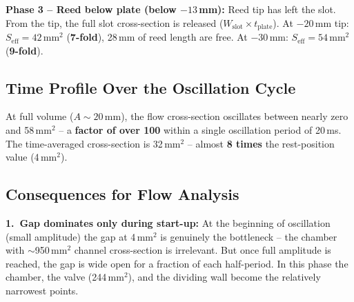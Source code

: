 \documentclass[11pt,a4paper]{article}
\begin{document}
\textbf{Phase 3 -- Reed below plate (below $-13$\,mm):} Reed tip has left the slot. From the tip, the full slot cross-section is released ($W_\text{slot} \times t_\text{plate}$). At $-20$\,mm tip: $S_\text{eff} = 42$\,mm$^2$ (\textbf{7-fold}), 28\,mm of reed length are free. At $-30$\,mm: $S_\text{eff} = 54$\,mm$^2$ (\textbf{9-fold}).

\subsection{Time Profile Over the Oscillation Cycle}

\begin{table}[H]
\centering\small
{}
\caption{Time-averaged gap area over one oscillation cycle (all $S$ in mm$^2$)}
\end{table}

\begin{warnbox}
At full volume ($A \sim 20$\,mm), the flow cross-section oscillates between nearly zero and 58\,mm$^2$ -- a \textbf{factor of over 100} within a single oscillation period of 20\,ms. The time-averaged cross-section is 32\,mm$^2$ -- almost \textbf{8 times} the rest-position value (4\,mm$^2$).
\end{warnbox}

\subsection{Consequences for Flow Analysis}

\textbf{1.\ Gap dominates only during start-up:} At the beginning of oscillation (small amplitude) the gap at 4\,mm$^2$ is genuinely the bottleneck -- the chamber with $\sim$950\,mm$^2$ channel cross-section is irrelevant. But once full amplitude is reached, the gap is wide open for a fraction of each half-period. In this phase the chamber, the valve (244\,mm$^2$), and the dividing wall become the relatively narrowest points.
\end{document}
